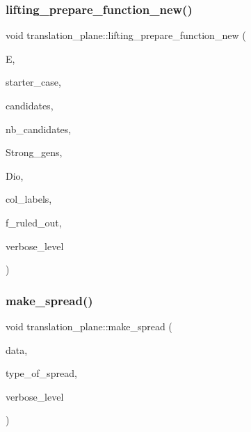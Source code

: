\subsubsection{\texorpdfstring{lifting\+\_\+prepare\+\_\+function\+\_\+new()}{lifting\_prepare\_function\_new()}}
{\footnotesize\ttfamily void translation\+\_\+plane\+::lifting\+\_\+prepare\+\_\+function\+\_\+new (\begin{DoxyParamCaption}\item[{\mbox{\hyperlink{classexact__cover}{exact\+\_\+cover}} $\ast$}]{E,  }\item[{\mbox{\hyperlink{galois_8h_a09fddde158a3a20bd2dcadb609de11dc}{I\+NT}}}]{starter\+\_\+case,  }\item[{\mbox{\hyperlink{galois_8h_a09fddde158a3a20bd2dcadb609de11dc}{I\+NT}} $\ast$}]{candidates,  }\item[{\mbox{\hyperlink{galois_8h_a09fddde158a3a20bd2dcadb609de11dc}{I\+NT}}}]{nb\+\_\+candidates,  }\item[{\mbox{\hyperlink{classstrong__generators}{strong\+\_\+generators}} $\ast$}]{Strong\+\_\+gens,  }\item[{\mbox{\hyperlink{classdiophant}{diophant}} $\ast$\&}]{Dio,  }\item[{\mbox{\hyperlink{galois_8h_a09fddde158a3a20bd2dcadb609de11dc}{I\+NT}} $\ast$\&}]{col\+\_\+labels,  }\item[{\mbox{\hyperlink{galois_8h_a09fddde158a3a20bd2dcadb609de11dc}{I\+NT}} \&}]{f\+\_\+ruled\+\_\+out,  }\item[{\mbox{\hyperlink{galois_8h_a09fddde158a3a20bd2dcadb609de11dc}{I\+NT}}}]{verbose\+\_\+level }\end{DoxyParamCaption})}

\mbox{\label{classtranslation__plane_ad83443f79972fcf6e85e0bfb86015d94}} 
\subsubsection{\texorpdfstring{make\+\_\+spread()}{make\_spread()}}
{\footnotesize\ttfamily void translation\+\_\+plane\+::make\+\_\+spread (\begin{DoxyParamCaption}\item[{\mbox{\hyperlink{galois_8h_a09fddde158a3a20bd2dcadb609de11dc}{I\+NT}} $\ast$}]{data,  }\item[{\mbox{\hyperlink{galois_8h_a09fddde158a3a20bd2dcadb609de11dc}{I\+NT}}}]{type\+\_\+of\+\_\+spread,  }\item[{\mbox{\hyperlink{galois_8h_a09fddde158a3a20bd2dcadb609de11dc}{I\+NT}}}]{verbose\+\_\+level }\end{DoxyParamCaption})}

